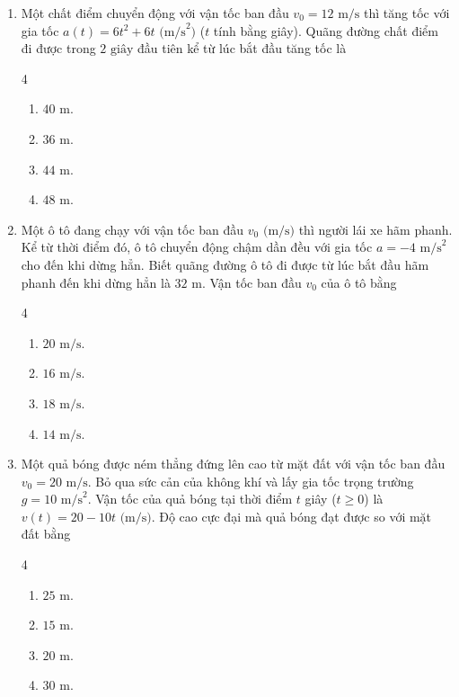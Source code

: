 \documentclass[12pt]{article}
\begin{document}
\begin{enumerate}[label=\textbf{Câu \arabic*.}]
		\item Một chất điểm chuyển động với vận tốc ban đầu $v_0 = 12\text{ m/s}$ thì tăng tốc với gia tốc $a(t) = 6t^2 + 6t\text{ (m/s}^2\text{)}$ ($t$ tính bằng giây). Quãng đường chất điểm đi được trong $2\text{ giây}$ đầu tiên kể từ lúc bắt đầu tăng tốc là
		\begin{multicols}{4}
			\begin{enumerate}[label=\textbf{\Alph*.}]
				\item $40\text{ m}$.
				\item $36\text{ m}$.
				\item $44\text{ m}$.
				\item $48\text{ m}$.
			\end{enumerate}
		\end{multicols}
		
		\item Một ô tô đang chạy với vận tốc ban đầu $v_0\text{ (m/s)}$ thì người lái xe hãm phanh. Kể từ thời điểm đó, ô tô chuyển động chậm dần đều với gia tốc $a = -4\text{ m/s}^2$ cho đến khi dừng hẳn. Biết quãng đường ô tô đi được từ lúc bắt đầu hãm phanh đến khi dừng hẳn là $32\text{ m}$. Vận tốc ban đầu $v_0$ của ô tô bằng
		\begin{multicols}{4}
			\begin{enumerate}[label=\textbf{\Alph*.}]
				\item $20\text{ m/s}$.
				\item $16\text{ m/s}$.
				\item $18\text{ m/s}$.
				\item $14\text{ m/s}$.
			\end{enumerate}
		\end{multicols}
		
		\item Một quả bóng được ném thẳng đứng lên cao từ mặt đất với vận tốc ban đầu $v_0 = 20\text{ m/s}$. Bỏ qua sức cản của không khí và lấy gia tốc trọng trường $g = 10\text{ m/s}^2$. Vận tốc của quả bóng tại thời điểm $t$ giây ($t \ge 0$) là $v(t) = 20 - 10t\text{ (m/s)}$. Độ cao cực đại mà quả bóng đạt được so với mặt đất bằng
		\begin{multicols}{4}
			\begin{enumerate}[label=\textbf{\Alph*.}]
				\item $25\text{ m}$.
				\item $15\text{ m}$.
				\item $20\text{ m}$.
				\item $30\text{ m}$.
			\end{enumerate}
		\end{multicols}
		

\end{enumerate}
\end{document}
